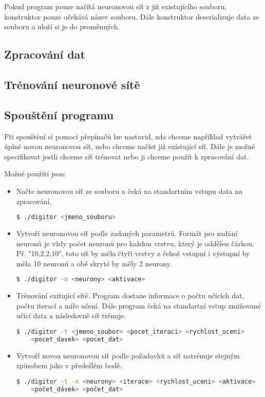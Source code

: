 Pokud program pouze načítá neuronovou síť z již existujícího souboru, konstruktor pouze očekává název souboru.
Dále konstruktor deserializuje data ze souboru a uloží si je do proměnných.

\subsection{Zpracování dat}

\subsection{Trénování neuronové sítě}

\subsection{Spouštění programu}
Při spouštění si pomocí přepínačů lze nastavid, zda chceme například vytvářet úplně novou neuronovou síť, nebo chceme načíst již exístující síť.
Dále je možné specifikovat jestli chceme síť trénovat nebo ji chceme použít k zpracování dat.

Možné použití jsou:
\begin{itemize}
    \item Načte neuronovou síť ze souboru a čeká na standartním vstupu data na zpracování.
    \begin{lstlisting}[language=bash, backgroundcolor=\color{backcolor}]
 $ ./digitor <jmeno_souboru>
    \end{lstlisting}

    \item Vytvoří neuronovou síť podle zadaných parametrů.
    Formát pro zadání neuronů je vždy počet neuronů pro každou vrstvu, který je oddělen čárkou.
    Př. "10,2,2,10", tato síť by měla čtyři vrstvy z čehož vstupní i výstupní by měla 10 neuronů a obě skryté by měly 2 neurony.
    \begin{lstlisting}[language=bash, backgroundcolor=\color{backcolor}]
 $ ./digitor -n <neurony> <aktivace>
    \end{lstlisting}

    \item Trénování exitující sítě. Program dostane informace o počtu učících dat, počtu iterací a míře učení.
    Dále program čeká na standartní vstup zmiňované učící data a následovně síť trénuje.
    \begin{lstlisting}[language=bash, backgroundcolor=\color{backcolor}]
 $ ./digitor -t <jmeno_soubor> <pocet_iteraci> <rychlost_uceni>
    <pocet_davek> <pocet_dat>
    \end{lstlisting}

    \item Vytvoří novou neuronovou síť podle požadavků a síť natrénuje stejným způsobem jako v předešlém bodě.
    \begin{lstlisting}[language=bash, backgroundcolor=\color{backcolor}]
 $ ./digitor -t -n <neurony> <iterace> <rychlost_uceni> <aktivace>
    <počet_dávek> <počet_dat>
    \end{lstlisting}
\end{itemize}

